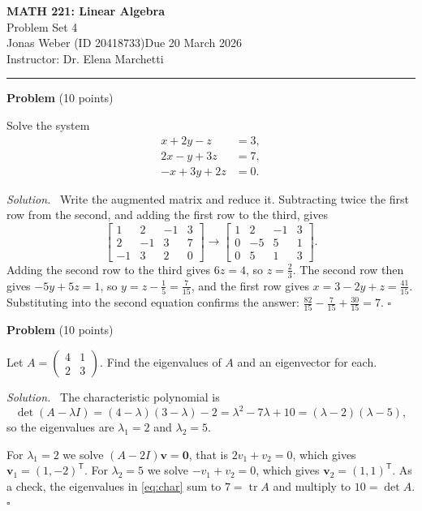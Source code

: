 \documentclass[11pt,a4paper]{article}
\newcommand{\course}{MATH 221: Linear Algebra}
\newcommand{\assignment}{Problem Set 4}
\newcommand{\student}{Jonas Weber (ID 20418733)}
\newcommand{\duedate}{Due 20 March 2026}
\newcounter{problem}
\newcommand{\problem}[1]{\stepcounter{problem}\bigskip\noindent\textbf{Problem \theproblem} \textnormal{(#1 points)}\par\nopagebreak}
\newenvironment{solution}{\par\noindent\textit{Solution.}\ }{\hfill$\square$\par}
\begin{document}
\begin{center}
  {\Large\bfseries \course}\\[4pt]
  {\large \assignment}\\[4pt]
  \student \quad\textbar\quad \duedate\\[2pt]
  Instructor: Dr. Elena Marchetti
\end{center}
\hrule

\problem{10}
Solve the system
\[
\begin{aligned}
  x + 2y - z &= 3,\\
  2x - y + 3z &= 7,\\
  -x + 3y + 2z &= 0.
\end{aligned}
\]

\begin{solution}
Write the augmented matrix and reduce it. Subtracting twice the first row from the second, and adding the first row to the third, gives
\[
\left[\begin{array}{rrr|r}
  1 & 2 & -1 & 3\\
  2 & -1 & 3 & 7\\
  -1 & 3 & 2 & 0
\end{array}\right]
\longrightarrow
\left[\begin{array}{rrr|r}
  1 & 2 & -1 & 3\\
  0 & -5 & 5 & 1\\
  0 & 5 & 1 & 3
\end{array}\right].
\]
Adding the second row to the third gives $6z = 4$, so $z = \tfrac{2}{3}$. The second row then gives $-5y + 5z = 1$, so $y = z - \tfrac{1}{5} = \tfrac{7}{15}$, and the first row gives $x = 3 - 2y + z = \tfrac{41}{15}$. Substituting into the second equation confirms the answer: $\tfrac{82}{15} - \tfrac{7}{15} + \tfrac{30}{15} = 7$.
\end{solution}

\problem{10}
Let $A = \begin{pmatrix} 4 & 1 \\ 2 & 3 \end{pmatrix}$. Find the eigenvalues of $A$ and an eigenvector for each.

\begin{solution}
The characteristic polynomial is
\begin{equation}\label{eq:char}
  \det(A - \lambda I) = (4 - \lambda)(3 - \lambda) - 2 = \lambda^2 - 7\lambda + 10 = (\lambda - 2)(\lambda - 5),
\end{equation}
so the eigenvalues are $\lambda_1 = 2$ and $\lambda_2 = 5$.

For $\lambda_1 = 2$ we solve $(A - 2I)\mathbf{v} = \mathbf{0}$, that is $2v_1 + v_2 = 0$, which gives $\mathbf{v}_1 = (1, -2)^{\mathsf{T}}$. For $\lambda_2 = 5$ we solve $-v_1 + v_2 = 0$, which gives $\mathbf{v}_2 = (1, 1)^{\mathsf{T}}$. As a check, the eigenvalues in \eqref{eq:char} sum to $7 = \operatorname{tr} A$ and multiply to $10 = \det A$.
\end{solution}
\end{document}

